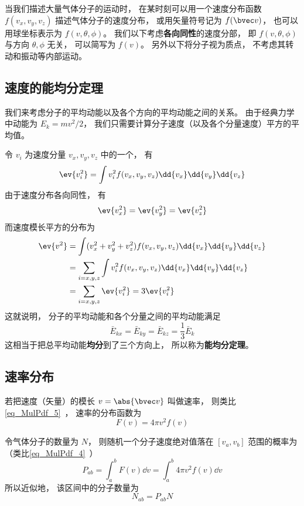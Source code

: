 
\begin{issues}
\issueTODO
\end{issues}

当我们描述大量气体分子的运动时， 在某时刻可以用一个速度分布函数 $f(v_x, v_y, v_z)$ 描述气体分子的速度分布， 或用矢量符号记为 $f(\bvec v)$， 也可以用球坐标表示为 $f(v, \theta, \phi)$。 我们以下考虑\textbf{各向同性}的速度分部， 即 $f(v, \theta, \phi)$ 与方向 $\theta, \phi$ 无关， 可以简写为 $f(v)$。 另外以下将分子视为质点， 不考虑其转动和振动等内部运动。

\subsection{速度的能均分定理}
我们来考虑分子的平均动能以及各个方向的平均动能之间的关系。 由于经典力学中动能为 $E_k = mv^2/2$， 我们只需要计算分子速度（以及各个分量速度）平方的平均值。

令 $v_i$ 为速度分量 $v_x, v_y, v_z$ 中的一个， 有
\begin{equation}
\ev{v_i^2} = \int v_i^2 f(v_x, v_y, v_z) \dd{v_x}\dd{v_y}\dd{v_z}
\end{equation}
由于速度分布各向同性， 有
\begin{equation}
\ev{v_x^2} = \ev{v_y^2} = \ev{v_z^2}
\end{equation}
而速度模长平方的分布为
\begin{equation}
\begin{aligned}
\ev{v^2} &= \int (v_x^2 + v_y^2 + v_z^2) f(v_x, v_y, v_z) \dd{v_x}\dd{v_y}\dd{v_z}\\
&= \sum_{i = x,y,z} \int v_i^2 f(v_x, v_y, v_z) \dd{v_x}\dd{v_y}\dd{v_z}\\
&= \sum_{i = x,y,z} \ev{v_i^2} = 3 \ev{v_i^2}
\end{aligned}
\end{equation}
这就说明， 分子的平均动能和各个分量之间的平均动能满足
\begin{equation}\label{eq_VelPdf_1}
\bar E_{kx} = \bar E_{ky} = \bar E_{kz} = \frac{1}{3} \bar E_k
\end{equation}
这相当于把总平均动能\textbf{均分}到了三个方向上， 所以称为\textbf{能均分定理}。

\subsection{速率分布}
若把速度（矢量）的模长 $v = \abs{\bvec v}$ 叫做速率， 则类比\autoref{eq_MulPdf_5}~， 速率的分布函数为
\begin{equation}
F(v) = 4\pi v^2 f(v)
\end{equation}

令气体分子的数量为 $N$， 则随机一个分子速度绝对值落在 $[v_a, v_b]$ 范围的概率为（类比\autoref{eq_MulPdf_4}~）
\begin{equation}
P_{ab} = \int_a^b F(v) \dd{v} = \int_a^b 4\pi v^2 f(v) \dd{v}
\end{equation}
所以近似地， 该区间中的分子数量为
\begin{equation}
N_{ab} = P_{ab} N
\end{equation}

